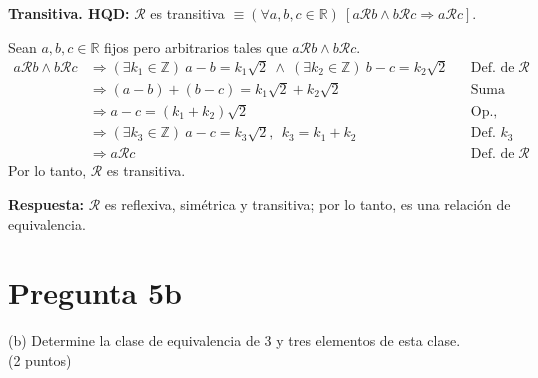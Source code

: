 \documentclass[11pt]{article}
\begin{document}
\textbf{Transitiva. HQD:} $\mathcal R$ es transitiva $\equiv(\forall a,b,c\in\mathbb R)\ [a\mathcal Rb\wedge b\mathcal Rc\Rightarrow a\mathcal Rc]$.

Sean $a,b,c\in\mathbb R$ fijos pero arbitrarios tales que $a\mathcal Rb\wedge b\mathcal Rc$.
\begin{align*}
a\mathcal Rb\wedge b\mathcal Rc&\Rightarrow(\exists k_1\in\mathbb Z)\ a-b=k_1\sqrt2\ \wedge\ (\exists k_2\in\mathbb Z)\ b-c=k_2\sqrt2 && \text{Def. de }\mathcal R\\
&\Rightarrow(a-b)+(b-c)=k_1\sqrt2+k_2\sqrt2 && \text{Suma término a término}\\
&\Rightarrow a-c=(k_1+k_2)\sqrt2 && \text{Op., Factor}\\
&\Rightarrow(\exists k_3\in\mathbb Z)\ a-c=k_3\sqrt2,\ \ k_3=k_1+k_2 && \text{Def. }k_3\\
&\Rightarrow a\mathcal Rc && \text{Def. de }\mathcal R
\end{align*}
Por lo tanto, $\mathcal R$ es transitiva.

\textbf{Respuesta:} $\mathcal R$ es reflexiva, simétrica y transitiva; por lo tanto, es una relación de equivalencia.

\clearpage
\section*{Pregunta 5b}

(b) Determine la \colorbox{green!35}{clase de equivalencia de 3} y \colorbox{green!35}{tres elementos} de esta clase.\\
(2 puntos)

\begin{center}
\end{center}
\end{document}
